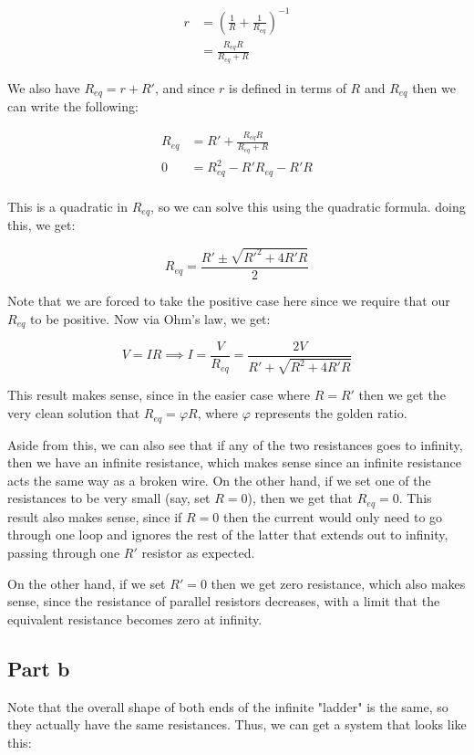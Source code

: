 \documentclass{article}
\theoremstyle{definition}
\numberwithin{equation}{section}
\numberwithin{definition}{section}
\begin{document}
\begin{align*}
    r &= \left(\frac{1}{R} + \frac{1}{R_{eq}}\right)^{-1}\\
    &= \frac{R_{eq}R}{R_{eq} + R}
\end{align*}

We also have $R_{eq} = r + R'$, and since $r$ is defined in terms of $R$ and $R_{eq}$ then we can write the following:

\begin{align*}
    R_{eq} &= R' + \frac{R_{eq}R}{R_{eq} + R}\\
    0 &= R_{eq}^2 - R'R_{eq} - R'R \\
\end{align*}

This is a quadratic in $R_{eq}$, so we can solve this using the quadratic formula. doing this, we get:

\[ R_{eq} = \frac{R' \pm \sqrt{R'^2 + 4R'R}}{2}\]

Note that we are forced to take the positive case here since we require that our $R_{eq}$ to be positive. Now via Ohm's law, we get:

\[ V = IR \implies I = \frac{V}{R_{eq}} = \frac{2V}{R' + \sqrt{R^2 + 4R'R}}\]


This result makes sense, since in the easier case where $R = R'$ then we get the very clean solution that $R_{eq} = \varphi R$, where $\varphi$ represents the golden ratio. 

Aside from this, we can also see that if any of the two resistances goes to infinity, then we have an infinite resistance, which makes sense since an infinite resistance acts the same way as a broken wire. On the other hand, if we set one of the resistances to be very small (say, set $R = 0$), then we get that $R_{eq} = 0$. This result also makes sense, since if $R = 0$ then the current would only need to go through one loop and ignores the rest of the latter that extends out to infinity, passing through one $R'$ resistor as expected.

On the other hand, if we set $R' = 0$ then we get zero resistance, which also makes sense, since the resistance of parallel resistors decreases, with a limit that the equivalent resistance becomes zero at infinity.

\subsection{Part b}

Note that the overall shape of both ends of the infinite "ladder" is the same, so they actually have the same resistances. Thus, we can get a system that looks like this: 
\end{document}
